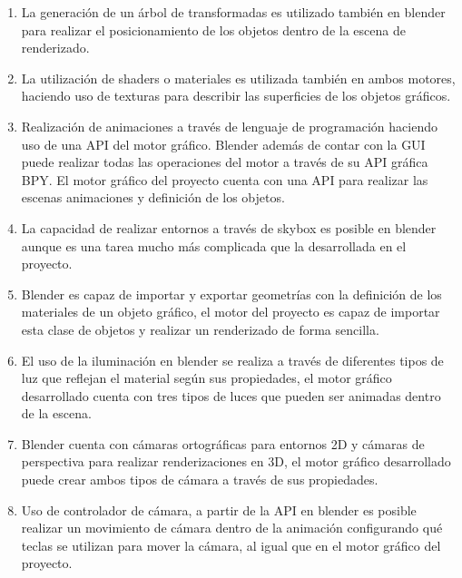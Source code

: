 \documentclass[a4paper, 17pt]{book}
\begin{document}
\begin{enumerate}
  \item La generación de un árbol de transformadas es utilizado también en blender para realizar el posicionamiento de
  los objetos dentro de la escena de renderizado.

  \item La utilización de shaders o materiales es utilizada también en ambos motores, haciendo uso de texturas para
  describir las superficies de los objetos gráficos.
  
  \item Realización de animaciones a través de lenguaje de programación haciendo uso de una API del motor gráfico.
  Blender además de contar con la GUI puede realizar todas las operaciones del motor a través de su API gráfica BPY. 
  El motor gráfico del proyecto cuenta con una API para realizar las escenas animaciones y definición de los objetos.

  \item La capacidad de realizar entornos a través de skybox es posible en blender aunque es una tarea mucho más 
  complicada que la desarrollada en el proyecto.

  \item Blender es capaz de importar y exportar geometrías con la definición de los materiales de un objeto gráfico,
  el motor del proyecto es capaz de importar esta clase de objetos y realizar un renderizado de forma sencilla.

  \item El uso de la iluminación en blender se realiza a través de diferentes tipos de luz que reflejan el material
  según sus propiedades, el motor gráfico desarrollado cuenta con tres tipos de luces que pueden ser animadas dentro
  de la escena.

  \item Blender cuenta con cámaras ortográficas para entornos 2D y cámaras de perspectiva para realizar renderizaciones
   en 3D, el motor gráfico desarrollado puede crear ambos tipos de cámara a través de sus propiedades.

  \item Uso de controlador de cámara, a partir de la API en blender es posible realizar un movimiento de cámara dentro
  de la animación configurando qué teclas se utilizan para mover la cámara, al igual que en el motor gráfico del proyecto.

\end{enumerate}
\end{document}
